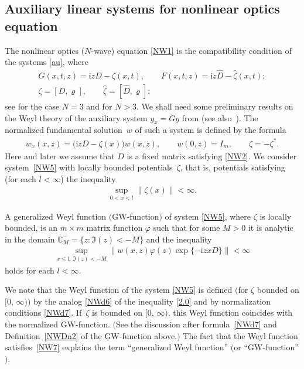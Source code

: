 \documentclass[11pt]{article}
\def\vr{\varrho}
\def\vp{\varphi}
\def\wh{\widehat}
\def\BC{{\mathbb C}}
\newcommand{\I}{\mathrm{i}}
\numberwithin{equation}{section}
\begin{document}
\setcounter{section}{2}
\setcounter{subsection}{1}
\setcounter{subsubsection}{0}
\setcounter{Theorem}{8}
\setcounter{equation}{8}
\subsection{Auxiliary linear systems for nonlinear optics equation}\label{subs2.2}

The nonlinear optics ($N$-wave) equation \eqref{NW1} is the compatibility condition
of the systems \eqref{au}, where
\begin{gather} \label{NW4}
G(x,t,z)=\I z D-\zeta(x,t), \qquad F(x,t,z)=\I z \wh D-\wh \zeta(x,t); \nonumber\\ \zeta=[D, \vr], \qquad \wh \zeta =[\wh D, \vr];
\end{gather}
see \cite{ZaMa} for the case $N=3$ and \cite{AbH} for $N>3$. We shall need
some preliminary results on the Weyl theory of the auxiliary system $y_x=Gy$
from \cite[Chapter~4]{SaSaR} (see also~\cite{SaA17}). The normalized fundamental solution~$w$
of such a system is def\/ined by the formula
\begin{gather} \label{NW5}
w_x(x,z)=\big(\I z D-\zeta(x)\big)w(x,z), \qquad w(0,z)=I_m, \qquad \zeta =- \zeta^* .
\end{gather}
Here and later we assume that $D$ is a f\/ixed matrix satisfying \eqref{NW2}. We consider
system~\eqref{NW5} with locally bounded potentials~$\zeta$, that is, potentials satisfying (for each $l<\infty$)
the inequality
\begin{gather}
  \sup\limits_{0 < x < l}
   \bigl\|
    \zeta (x)
   \bigr\|
  < \infty.
 \label{NW6}
\end{gather}
\begin{Definition} \label{NWDn2}
 A generalized Weyl function $($GW-function$)$ of system
\eqref{NW5}, where $\zeta$ is locally bounded, is an $m \times m$ matrix function $\vp$ such that for some $M>0$ it is analytic in the domain
$\BC^{-}_M = \{ z \colon \Im(z) < - M \}$ and the
inequality
\begin{gather}
  \sup\limits_{x \leq l, \, \Im (z) < -M}
   \bigl\|
    w(x,z)
    \varphi (z)\exp \{-\I z x D\}
   \bigr\|
 < \infty
 \label{NW7}
\end{gather}
holds for each
$l < \infty$.
\end{Definition}

\begin{Remark} We note that the Weyl function of the system \eqref{NW5} is def\/ined $\big($for $\zeta$ bounded on $[0,\, \infty)\big)$
by the analog \eqref{NWd6} of the inequality \eqref{2.0} and by normalization conditions \eqref{NWd7}. If~$\zeta$ is bounded on $[0,\, \infty)$, this Weyl function
coincides with the normalized {\rm GW}-function.
$($See the discussion after formula~\eqref{NWd7} and Def\/inition~\ref{NWDn2} of the {\rm GW}-function above.$)$ The fact that the Weyl function satisf\/ies~\eqref{NW7} explains the term ``generalized Weyl function'' $($or ``{\rm GW}-function''$)$.
\end{Remark}
\end{document}
